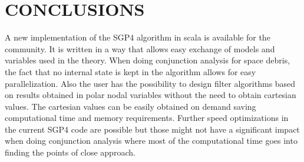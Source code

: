 \documentclass{article}
\begin{document}
\section{CONCLUSIONS}
\label{sec:conclusions}

A new implementation of the SGP4 algorithm in scala is available for the community. It is
written in a way that allows easy exchange of models and variables used in the theory.
When doing conjunction analysis for space debris, the fact that no internal state is kept in the algorithm allows for easy
parallelization. Also the user has the possibility to design
filter algorithms based on results obtained in polar nodal variables without
the need to obtain cartesian values. The cartesian values can be easily obtained on demand
saving computational time and memory requirements. Further speed optimizations in the current
SGP4 code are possible but those might not have a significant impact when doing conjunction analysis
where most of the computational time goes into finding the points of close approach.












\end{document}
